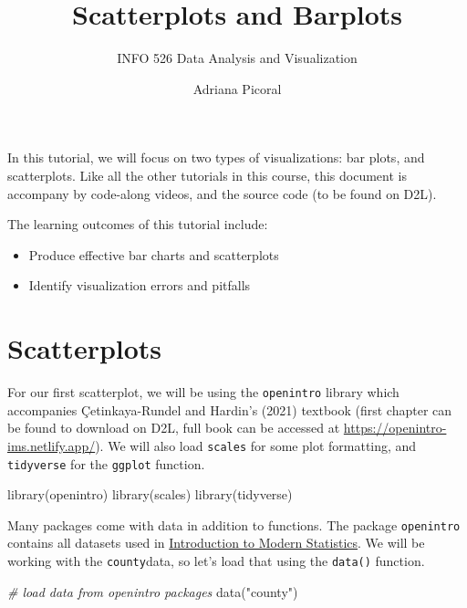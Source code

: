 \documentclass[
]{article}
\title{Scatterplots and Barplots}
\subtitle{INFO 526 Data Analysis and Visualization}
\author{Adriana Picoral}
\date{}
\newenvironment{Shaded}{\begin{snugshade}}{\end{snugshade}}
\newcommand{\CommentTok}[1]{\textcolor[rgb]{0.56,0.35,0.01}{\textit{#1}}}
\newcommand{\FunctionTok}[1]{\textcolor[rgb]{0.00,0.00,0.00}{#1}}
\newcommand{\NormalTok}[1]{#1}
\newcommand{\StringTok}[1]{\textcolor[rgb]{0.31,0.60,0.02}{#1}}
\providecommand{\tightlist}{%
  \setlength{\itemsep}{0pt}\setlength{\parskip}{0pt}}
\begin{document}
\maketitle

In this tutorial, we will focus on two types of visualizations: bar
plots, and scatterplots. Like all the other tutorials in this course,
this document is accompany by code-along videos, and the source code (to
be found on D2L).

The learning outcomes of this tutorial include:

\begin{itemize}
\tightlist
\item
  Produce effective bar charts and scatterplots
\item
  Identify visualization errors and pitfalls
\end{itemize}

\hypertarget{scatterplots}{%
\section{Scatterplots}\label{scatterplots}}

For our first scatterplot, we will be using the \texttt{openintro}
library which accompanies Çetinkaya-Rundel and Hardin's (2021) textbook
(first chapter can be found to download on D2L, full book can be
accessed at \url{https://openintro-ims.netlify.app/}). We will also load
\texttt{scales} for some plot formatting, and \texttt{tidyverse} for the
\texttt{ggplot} function.

\begin{Shaded}
\begin{Highlighting}[]
\FunctionTok{library}\NormalTok{(openintro)}
\FunctionTok{library}\NormalTok{(scales)}
\FunctionTok{library}\NormalTok{(tidyverse)}
\end{Highlighting}
\end{Shaded}

Many packages come with data in addition to functions. The package
\texttt{openintro} contains all datasets used in
\href{https://openintro-ims.netlify.app/}{Introduction to Modern
Statistics}. We will be working with the \texttt{county}data, so let's
load that using the \texttt{data()} function.

\begin{Shaded}
\begin{Highlighting}[]
\CommentTok{\# load data from openintro packages}
\FunctionTok{data}\NormalTok{(}\StringTok{"county"}\NormalTok{)}
\end{Highlighting}
\end{Shaded}
\end{document}
